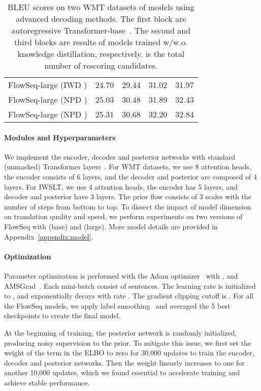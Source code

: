\documentclass[11pt,a4paper]{article}
\begin{document}
\begin{table}[t]
{\begin{tabular}{lcccc}
\hdashline
FlowSeq-large (IWD ) & 24.70  & 29.44 & 31.02 & 31.97 \\
FlowSeq-large (NPD ) & 25.03 & 30.48 & 31.89 & 32.43 \\
FlowSeq-large (NPD ) & 25.31 & 30.68 & 32.20 & 32.84 \\
\bottomrule
\end{tabular}
}
\caption{BLEU scores on two WMT datasets of models using advanced decoding methods. 
The first block are autoregressive Transformer-base~\citep{vaswani2017attention}.
The second and third blocks are results of models trained w/w.o. knowledge distillation, respectively.
 is the total number of rescoring candidates.}
\label{tab:refine}
\vspace{-4mm}
\end{table}

\paragraph{Modules and Hyperparameters}
We implement the encoder, decoder and posterior networks with standard (unmasked) Transformer layers~\citep{vaswani2017attention}.
For WMT datasets, we use 8 attention heads, the encoder consists of 6 layers, and the decoder and posterior are composed of 4 layers.
For IWSLT, we use 4 attention heads, the encoder has 5 layers, and decoder and posterior have 3 layers.
The prior flow consists of 3 scales with the number of steps  from bottom to top.
To dissect the impact of model dimension on translation quality and speed, we perform experiments on two versions of FlowSeq with  (base) and  (large).
More model details are provided in Appendix~\ref{appendix:model}.

\paragraph{Optimization}
Parameter optimization is performed with the Adam optimizer~\citep{kingma2014adam} with ,   and AMSGrad~\citep{iclr2018amsgrad}. 
Each mini-batch consist of  sentences.
The learning rate is initialized to , and exponentially decays with rate .
The gradient clipping cutoff is .
For all the FlowSeq models, we apply  label smoothing~\citep{vaswani2017attention} and averaged the 5 best checkpoints to create the final model.

At the beginning of training, the posterior network is randomly initialized, producing noisy supervision to the prior.
To mitigate this issue, we first set the weight of the  term in the ELBO to zero for 30,000 updates to train the encoder, decoder and posterior networks.
Then the  weight linearly increases to one for another 10,000 updates, which we found essential to accelerate training and achieve stable performance.
\end{document}
